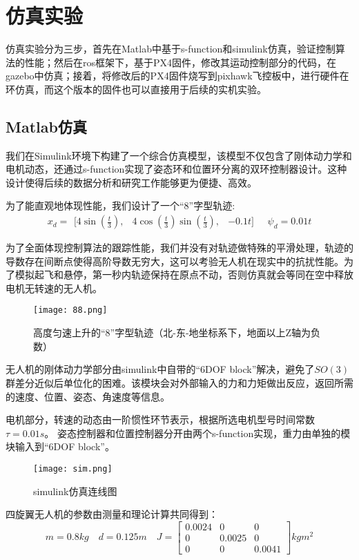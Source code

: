 \chapter{仿真实验}
仿真实验分为三步，首先在Matlab中基于s-function和simulink仿真，验证控制算法的性能；然后在ros框架下，基于PX4固件，修改其运动控制部分的代码，在gazebo中仿真；接着，将修改后的PX4固件烧写到pixhawk飞控板中，进行硬件在环仿真，而这个版本的固件也可以直接用于后续的实机实验。
\section{Matlab仿真}
我们在Simulink环境下构建了一个综合仿真模型，该模型不仅包含了刚体动力学和电机动态，还通过s-function实现了姿态环和位置环分离的双环控制器设计。这种设计使得后续的数据分析和研究工作能够更为便捷、高效。

为了能直观地体现性能，我们设计了一个“8”字型轨迹:
$$x_d = \begin{matrix}[4\sin(\frac{t}{3}), & 4\cos(\frac{t}{3})\sin(\frac{t}{3}), &-0.1t]\end{matrix}
\quad
\psi_d=0.01t$$

为了全面体现控制算法的跟踪性能，我们并没有对轨迹做特殊的平滑处理，轨迹的导数存在间断点使得高阶导数无穷大，这可以考验无人机在现实中的抗扰性能。为了模拟起飞和悬停，第一秒内轨迹保持在原点不动，否则仿真就会等同在空中释放电机无转速的无人机。

\begin{figure}[!h]
    \centering
    \texttt{[image: 88.png]}
    \caption{高度匀速上升的“8”字型轨迹（北-东-地坐标系下，地面以上Z轴为负数）}
    \label{fig:8}
  \end{figure}

  无人机的刚体动力学部分由simulink中自带的“6DOF block”解决，避免了$SO(3)$群差分近似后单位化的困难。该模块会对外部输入的力和力矩做出反应，返回所需的速度、位置、姿态、角速度等信息。

  电机部分，转速的动态由一阶惯性环节表示，根据所选电机型号时间常数$\tau=0.01s$。
  姿态控制器和位置控制器分开由两个s-function实现，重力由单独的模块输入到“6DOF block”。
  \begin{figure}[!h]
    \centering
    \texttt{[image: sim.png]}
    \caption{simulink仿真连线图}
    \label{fig:sim}
  \end{figure}

  四旋翼无人机的参数由测量和理论计算共同得到：
  $$m=0.8kg \quad d=0.125m \quad J=\begin{bmatrix}
    0.0024   &      0  &       0\\
    0 &   0.0025      &   0\\
    0  &       0   & 0.0041
  \end{bmatrix}kg m^2$$

